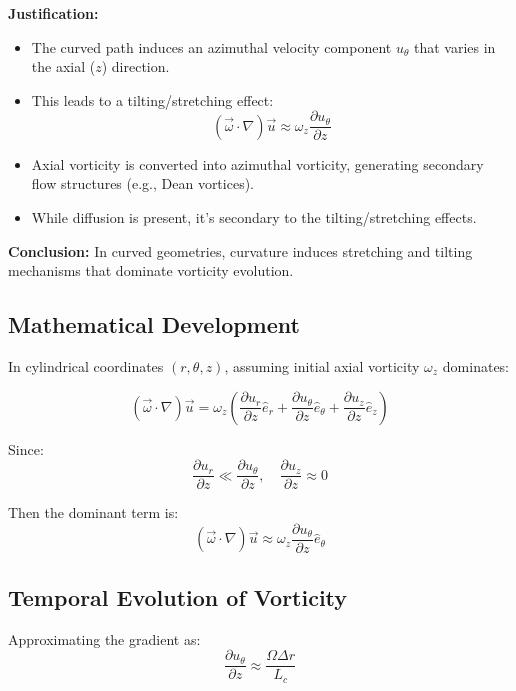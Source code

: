\documentclass{article}
\begin{document}
\textbf{Justification:}
\begin{itemize}
    \item The curved path induces an azimuthal velocity component $u_\theta$ that varies in the axial ($z$) direction.
    \item This leads to a tilting/stretching effect:
    \[
    (\vec{\omega} \cdot \nabla)\vec{u} \approx \omega_z \frac{\partial u_\theta}{\partial z}
    \]
    \item Axial vorticity is converted into azimuthal vorticity, generating secondary flow structures (e.g., Dean vortices).
    \item While diffusion is present, it's secondary to the tilting/stretching effects.
\end{itemize}

\textbf{Conclusion:} In curved geometries, curvature induces stretching and tilting mechanisms that dominate vorticity evolution.

\subsection{Mathematical Development}
In cylindrical coordinates $(r,\theta,z)$, assuming initial axial vorticity $\omega_z$ dominates:

\begin{equation}
    (\vec{\omega} \cdot \nabla)\vec{u} = \omega_z \left(
        \frac{\partial u_r}{\partial z} \hat{e}_r +
        \frac{\partial u_\theta}{\partial z} \hat{e}_\theta +
        \frac{\partial u_z}{\partial z} \hat{e}_z
    \right)
\end{equation}

Since:
\[
\frac{\partial u_r}{\partial z} \ll \frac{\partial u_\theta}{\partial z}, \quad \frac{\partial u_z}{\partial z} \approx 0
\]

Then the dominant term is:
\begin{equation}
    (\vec{\omega} \cdot \nabla)\vec{u} \approx \omega_z \frac{\partial u_\theta}{\partial z} \hat{e}_\theta
\end{equation}

\subsection{Temporal Evolution of Vorticity}

Approximating the gradient as:
\begin{equation}
    \frac{\partial u_\theta}{\partial z} \approx \frac{\Omega \Delta r}{L_c}
\end{equation}
\end{document}
